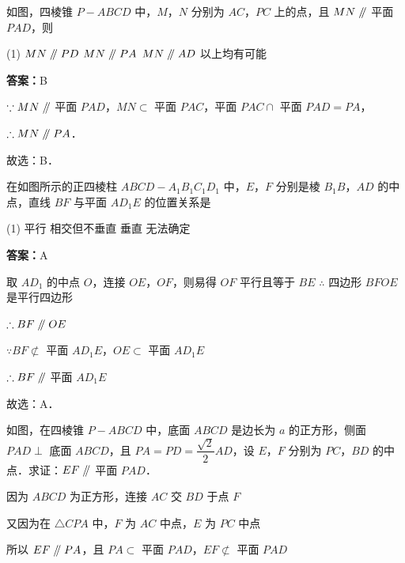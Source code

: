 \vspace{2em}

\begin{example}[\bkstar{2}{5}]
如图，四棱锥 $P-ABCD$ 中，$M$，$N$ 分别为 $AC$，$PC$ 上的点，且 $MN\mathrel{/\mkern-5mu/}$ 平面 $PAD$，则
\begin{tasks}(1)
    \task $MN\mathrel{/\mkern-5mu/} PD$
    \task $MN\mathrel{/\mkern-5mu/} PA$
    \task $MN\mathrel{/\mkern-5mu/} AD$
    \task 以上均有可能
\end{tasks}
\end{example}
\begin{solution}
\textbf{答案：}B

$\because MN\mathrel{/\mkern-5mu/}$ 平面 $PAD$，$MN\subset$ 平面 $PAC$，平面 $PAC\cap$ 平面 $PAD=PA$，

$\therefore MN\mathrel{/\mkern-5mu/} PA$．

故选：B．
\end{solution}

\vspace{2em}

\begin{example}[\bkstar{3}{5}]
在如图所示的正四棱柱 $ABCD-A_1B_1C_1D_1$ 中，$E$，$F$ 分别是棱 $B_1B$，$AD$ 的中点，直线 $BF$ 与平面 $AD_1E$ 的位置关系是
\begin{tasks}(1)
    \task 平行
    \task 相交但不垂直
    \task 垂直
    \task 无法确定
\end{tasks}
\end{example}
\begin{solution}
\textbf{答案：}A

取 $AD_1$ 的中点 $O$，连接 $OE$，$OF$，则易得 $OF$ 平行且等于 $BE$
$\therefore$ 四边形 $BFOE$ 是平行四边形

$\therefore BF\mathrel{/\mkern-5mu/} OE$

$\because BF\not\subset$ 平面 $AD_1E$，$OE\subset$ 平面 $AD_1E$

$\therefore BF\mathrel{/\mkern-5mu/}$ 平面 $AD_1E$

故选：A．
\end{solution}

\vspace{2em}

\begin{example}[\bkstar{3}{5}]
如图，在四棱锥 $P-ABCD$ 中，底面 $ABCD$ 是边长为 $a$ 的正方形，侧面 $PAD\perp$ 底面 $ABCD$，且 $PA=PD=\dfrac{\sqrt{2}}{2}AD$，设 $E$，$F$ 分别为 $PC$，$BD$ 的中点．求证：$EF\mathrel{/\mkern-5mu/}$ 平面 $PAD$．
\end{example}
\begin{solution}
因为 $ABCD$ 为正方形，连接 $AC$ 交 $BD$ 于点 $F$

又因为在 $\triangle CPA$ 中，$F$ 为 $AC$ 中点，$E$ 为 $PC$ 中点

所以 $EF\mathrel{/\mkern-5mu/} PA$，且 $PA\subset$ 平面 $PAD$，$EF\not\subset$ 平面 $PAD$ %
\end{solution}

